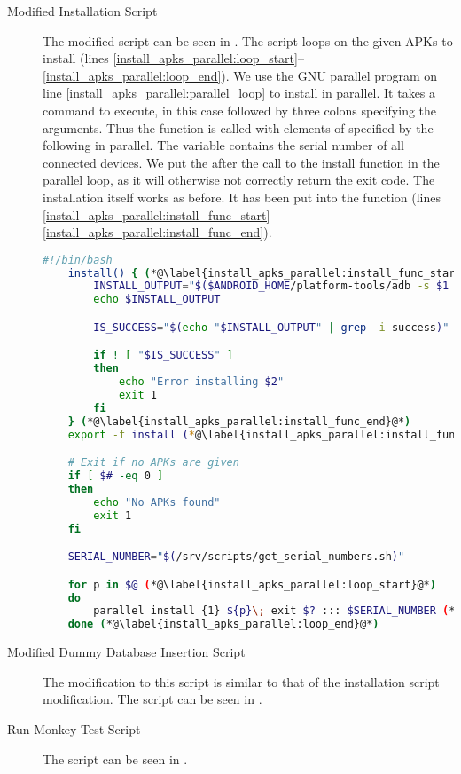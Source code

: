 \begin{description}
    \item[Modified Installation Script] The modified script can be seen in . The script loops on the given APKs to install (lines \ref{install_apks_parallel:loop_start}--\ref{install_apks_parallel:loop_end}). We use the GNU parallel program \parencite{Tange2011a} on line \ref{install_apks_parallel:parallel_loop} to install in parallel. It takes a command to execute, in this case  followed by three colons specifying the arguments. Thus the  function is called with elements of  specified by the  following  in parallel. The  variable contains the serial number of all connected devices. We put the  after the call to the install function in the parallel loop, as it will otherwise not correctly return the exit code. The installation itself works as before. It has been put into the  function (lines \ref{install_apks_parallel:install_func_start}--\ref{install_apks_parallel:install_func_end}).

    \begin{lstlisting}[language=bash,caption=Script that install APKs on all connected devices in parallel,label=lst:install_apks_parallel]
    #!/bin/bash
    install() { (*@\label{install_apks_parallel:install_func_start}@*)
        INSTALL_OUTPUT="$($ANDROID_HOME/platform-tools/adb -s $1 install $2)"
        echo $INSTALL_OUTPUT

        IS_SUCCESS="$(echo "$INSTALL_OUTPUT" | grep -i success)"

        if ! [ "$IS_SUCCESS" ]
        then
            echo "Error installing $2"
            exit 1
        fi
    } (*@\label{install_apks_parallel:install_func_end}@*)
    export -f install (*@\label{install_apks_parallel:install_func_export}@*)

    # Exit if no APKs are given
    if [ $# -eq 0 ]
    then
        echo "No APKs found"
        exit 1
    fi

    SERIAL_NUMBER="$(/srv/scripts/get_serial_numbers.sh)"

    for p in $@ (*@\label{install_apks_parallel:loop_start}@*)
    do
        parallel install {1} ${p}\; exit $? ::: $SERIAL_NUMBER (*@\label{install_apks_parallel:parallel_loop}@*)
    done (*@\label{install_apks_parallel:loop_end}@*)
    \end{lstlisting}
    \item[Modified Dummy Database Insertion Script] The modification to this script is similar to that of the installation script modification. The script can be seen in .
    \item[Run Monkey Test Script] \dummy The script can be seen in .


\end{description}
